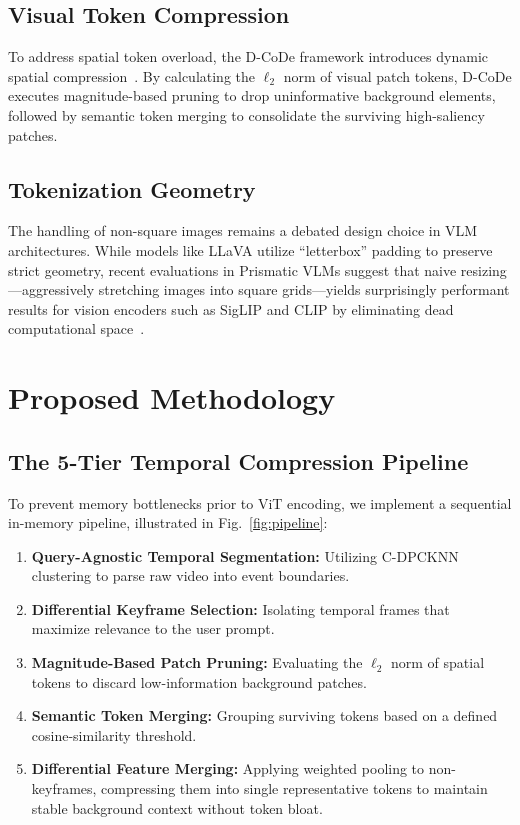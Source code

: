 \documentclass[conference]{IEEEtran}
\begin{document}
\subsection{Visual Token Compression}
To address spatial token overload, the D-CoDe framework introduces dynamic
spatial compression~\cite{dcode}.
By calculating the $\ell_2$ norm of visual patch tokens, D-CoDe executes
magnitude-based pruning to drop uninformative background elements, followed
by semantic token merging to consolidate the surviving high-saliency patches.

\subsection{Tokenization Geometry}
The handling of non-square images remains a debated design choice in VLM
architectures.
While models like LLaVA utilize ``letterbox'' padding to preserve strict
geometry, recent evaluations in Prismatic VLMs suggest that naive
resizing---aggressively stretching images into square grids---yields
surprisingly performant results for vision encoders such as SigLIP and CLIP
by eliminating dead computational space~\cite{prismatic}.

\section{Proposed Methodology}

\subsection{The 5-Tier Temporal Compression Pipeline}
To prevent memory bottlenecks prior to ViT encoding, we implement a
sequential in-memory pipeline, illustrated in Fig.~\ref{fig:pipeline}:
\begin{enumerate}
  \item \textbf{Query-Agnostic Temporal Segmentation:} Utilizing C-DPCKNN
    clustering to parse raw video into event boundaries.
  \item \textbf{Differential Keyframe Selection:} Isolating temporal frames
    that maximize relevance to the user prompt.
  \item \textbf{Magnitude-Based Patch Pruning:} Evaluating the $\ell_2$ norm
    of spatial tokens to discard low-information background patches.
  \item \textbf{Semantic Token Merging:} Grouping surviving tokens based on a
    defined cosine-similarity threshold.
  \item \textbf{Differential Feature Merging:} Applying weighted pooling to
    non-keyframes, compressing them into single representative tokens to
    maintain stable background context without token bloat.
\end{enumerate}
\end{document}
